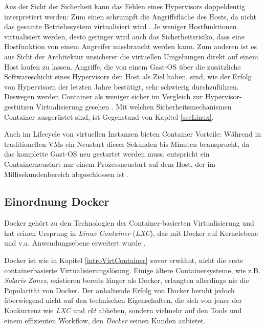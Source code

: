 \documentclass[../main.tex]{subfiles}
\begin{document}
      Aus der Sicht der Sicherheit kann das Fehlen eines Hypervisors doppeldeutig interpretiert werden: Zum einen schrumpft die Angriffsfläche des Hosts, da nicht das gesamte Betriebssystem virtualisiert wird \cite[S.6]{dockerBook}. Je weniger Hostfunktionen virtualisiert werden, desto geringer wird auch das Sicherheitsrisiko, dass eine Hostfunktion von einem Angreifer missbraucht werden kann. Zum anderen ist es aus Sicht der Architektur unsicherer die virtuellen Umgebungen direkt auf einem Host laufen zu lassen. Angriffe, die von einem Gast-\acrshort{OS} über die zusätzliche Softwareschicht eines Hypervisors den Host als Ziel haben, sind, wie der Erfolg von Hypervisorn der letzten Jahre bestätigt, sehr schwierig durchzuführen.
			Deswegen werden Container als weniger sicher im Vergleich zur Hypervisor-gestützen Virtualisierung gesehen \cite[S.6]{dockerBook}. Mit welchen Sicherheitsmechanismen Container ausgerüstet sind, ist Gegenstand von Kapitel \ref{secLinux}.


			Auch im Lifecycle von virtuellen Instanzen bieten Container Vorteile: Während in traditionellen \acrshort{VM}s ein Neustart dieser Sekunden bis Minuten beansprucht, da das komplette Gast-\acrshort{OS} neu gestartet werden muss, entspricht ein Containerneustart nur einem Prozessneustart auf dem Host, der im Millisekundenbereich abgeschlossen ist \cite[S.2]{dockerLXCKub}.

	  \subsection{Einordnung Docker}
      Docker gehört zu den Technologien der Container-basierten Virtualisierung und hat seinen Ursprung in \emph{Linux Container} (\emph{LXC}), das mit Docker auf Kernelebene und v.a. Anwendungsebene erweitert wurde \cite[S.7]{dockerBook}\cite[S.1]{containerVirtPerformance}\cite[S.2]{dockerLXCKub}.


      Docker ist wie in Kapitel \ref{introVirtContainer} zuvor erwähnt, nicht die erste containerbasierte Virtualisierungslösung. Einige ältere Containersysteme, wie z.B. \emph{Solaris Zones}, existieren bereits länger als Docker, erlangten allerdings nie die Popularität von Docker. Der anhaltende Erfolg von Docker beruht jedoch überwiegend nicht auf den technischen Eigenschaften, die sich von jener der Konkurrenz wie \emph{LXC} und \emph{rkt} abheben, sondern vielmehr auf den Tools und einem effizienten Workflow, den \emph{Docker} seinen Kunden anbietet.
\end{document}

